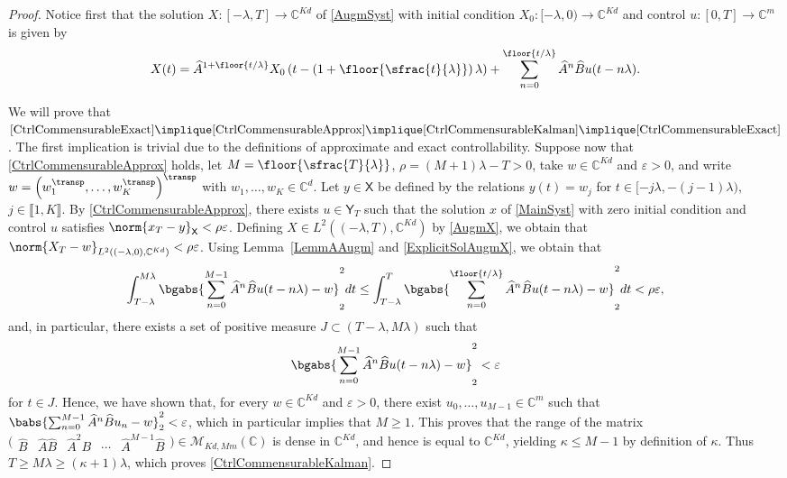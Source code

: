 \begin{proof}
Notice first that the solution $X: [-\lambda, T] \to \mathbb C^{Kd}$ of \eqref{AugmSyst} with initial condition $X_0: [-\lambda, 0) \to \mathbb C^{Kd}$ and control $u: [0, T] \to \mathbb C^m$ is given by
\begin{equation}
\label{ExplicitSolAugmX}
X(t) = \widehat A^{1 + \floor{t/\lambda}} X_0\left(t - \left(1 + \floor{\sfrac{t}{\lambda}}\right) \lambda\right) + \sum_{n=0}^{\floor{t/\lambda}} \widehat A^n \widehat B u(t - n\lambda).
\end{equation}

We will prove that $\eqref{CtrlCommensurableExact}\implique \eqref{CtrlCommensurableApprox}\implique \eqref{CtrlCommensurableKalman}\implique\eqref{CtrlCommensurableExact}$. The first implication is trivial due to the definitions of approximate and exact controllability. Suppose now that \eqref{CtrlCommensurableApprox} holds, let $M = \floor{\sfrac{T}{\lambda}}$, $\rho = (M+1)\lambda - T > 0$, take $w \in \mathbb C^{Kd}$ and $\varepsilon > 0$, and write $w = \left(w_1^\transp, \dots, w_K^\transp\right)^\transp$ with $w_1, \dots, w_K \in \mathbb C^d$. Let $y \in \mathsf X$ be defined by the relations $y(t) = w_j$ for $t \in [-j\lambda, -(j-1)\lambda)$, $j \in \llbracket 1, K\rrbracket$. By \eqref{CtrlCommensurableApprox}, there exists $u \in \mathsf Y_T$ such that the solution $x$ of \eqref{MainSyst} with zero initial condition and control $u$ satisfies $\norm{x_T - y}_{\mathsf X} < \rho\varepsilon$. Defining $X \in L^2((-\lambda, T), \mathbb C^{Kd})$ by \eqref{AugmX}, we obtain that $\norm{X_T - w}_{L^2((-\lambda, 0), \mathbb C^{Kd})} < \rho\varepsilon$. Using Lemma~\ref{LemmAAugm} and \eqref{ExplicitSolAugmX}, we obtain that
\[
\int_{T - \lambda}^{M\lambda} \bgabs{\sum_{n=0}^{M-1} \widehat A^n \widehat B u(t - n\lambda) - w}_{2}^2 dt \leq \int_{T - \lambda}^T \bgabs{\sum_{n=0}^{\floor{t/\lambda}} \widehat A^n \widehat B u(t - n\lambda) - w}_{2}^2 dt < \rho\varepsilon,
\]
and, in particular, there exists a set of positive measure $J \subset (T - \lambda, M\lambda)$ such that
\[
\bgabs{\sum_{n=0}^{M-1} \widehat A^n \widehat B u(t - n\lambda) - w}_{2}^2 < \varepsilon
\]
for $t \in J$. Hence, we have shown that, for every $w \in \mathbb C^{K d}$ and $\varepsilon > 0$, there exist $u_0, \dots, u_{M-1} \in \mathbb C^m$ such that $\babs{\sum_{n=0}^{M-1} \widehat A^n \widehat B u_n - w}_2^2 < \varepsilon$, which in particular implies that $M \geq 1$. This proves that the range of the matrix $\bigl(\begin{matrix}\widehat B & \widehat A \widehat B & \widehat A^2 B & \cdots & \widehat A^{M-1} \widehat B\end{matrix}\bigr) \in \mathcal M_{Kd, M m}(\mathbb C)$ is dense in $\mathbb C^{Kd}$, and hence is equal to $\mathbb C^{Kd}$, yielding $\kappa \leq M - 1$ by definition of $\kappa$. Thus $T \geq M \lambda \geq (\kappa + 1)\lambda$, which proves \eqref{CtrlCommensurableKalman}.


\end{proof}
